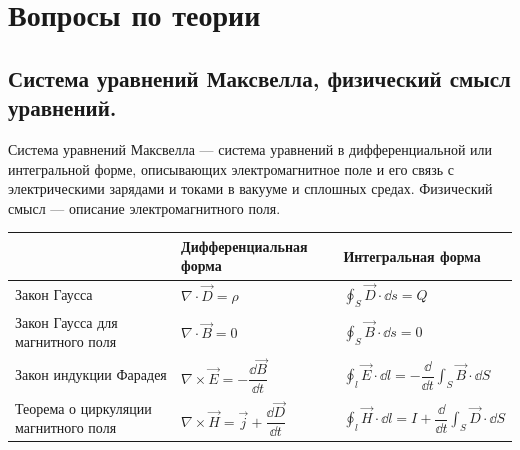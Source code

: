 \documentclass[12pt]{report}
\begin{document}
\chapter{Вопросы по теории}

\section{Система уравнений Максвелла, физический смысл уравнений.}
Система уравнений Максвелла — система уравнений в дифференциальной или интегральной форме, описывающих электромагнитное поле и его связь с электрическими зарядами и токами в вакууме и сплошных средах. Физический смысл --- описание электромагнитного поля.

\begin{tabular}{|l|l|l|}
    \hline
                                         & Дифференциальная форма                                        & Интегральная форма                                                                            \\
    \hline
    Закон Гаусса                         & $\displaystyle \nabla \cdot \vec D = \rho$                    & $\displaystyle \oint_S \vec D \cdot \dd s = Q$                                                \\
    \hline
    Закон Гаусса для магнитного поля     & $\nabla \cdot \vec B = 0$                                     & $\displaystyle \oint_S \vec B \cdot \dd s = 0$                                                \\
    \hline
    Закон индукции Фарадея               & $\nabla \times \vec E = -\dfrac{\dd{\vec B}}{\dd{t}}$         & $\displaystyle \oint_l \vec E \cdot \dd l = -\dfrac{\dd}{\dd{t}}\int_S \vec B \cdot \dd S$    \\
    \hline
    Теорема о циркуляции магнитного поля & $\nabla \times \vec H = \vec j + \dfrac{\dd{\vec D}}{\dd{t}}$ & $\displaystyle \oint_l \vec H \cdot \dd l = I + \dfrac{\dd}{\dd t} \int_S \vec D \cdot \dd S$ \\
    \hline
\end{tabular}
\end{document}
